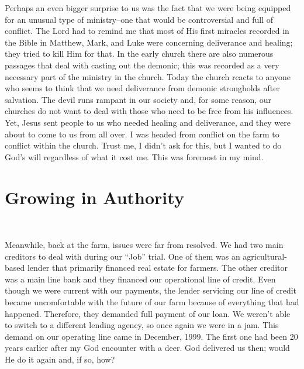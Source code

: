 \documentclass[oneside]{book}
\begin{document}
Perhaps an even bigger surprise to us was the fact that we were being equipped for an unusual type of ministry--one that would be controversial and full of conflict. The Lord had to remind me that most of His first miracles recorded in the Bible in Matthew, Mark, and Luke were concerning deliverance and healing; they tried to kill Him for that. In the early church there are also numerous passages that deal with casting out the demonic; this was recorded as a very necessary part of the ministry in the church. Today the church reacts to anyone who seems to think that we need deliverance from demonic strongholds after salvation. The devil runs rampant in our society and, for some reason, our churches do not want to deal with those who need to be free from his influences. Yet, Jesus sent people to us who needed healing and deliverance, and they were about to come to us from all over. I was headed from conflict on the farm to conflict within the church. Trust me, I didn’t ask for this, but I wanted to do God’s will regardless of what it cost me. This was foremost in my mind.


\chapter{Growing in Authority}
\

Meanwhile, back at the farm, issues were far from resolved. We had two main creditors to deal with during our “Job” trial. One of them was an agricultural-based lender that primarily financed real estate for farmers. The other creditor was a main line bank and they financed our operational line of credit. Even though we were current with our payments, the lender servicing our line of credit became uncomfortable with the future of our farm because of everything that had happened. Therefore, they demanded full payment of our loan. We weren’t able to switch to a different lending agency, so once again we were in a jam. This demand on our operating line came in December, 1999. The first one had been 20 years earlier after my God encounter with a deer. God delivered us then; would He do it again and, if so, how?
\end{document}
